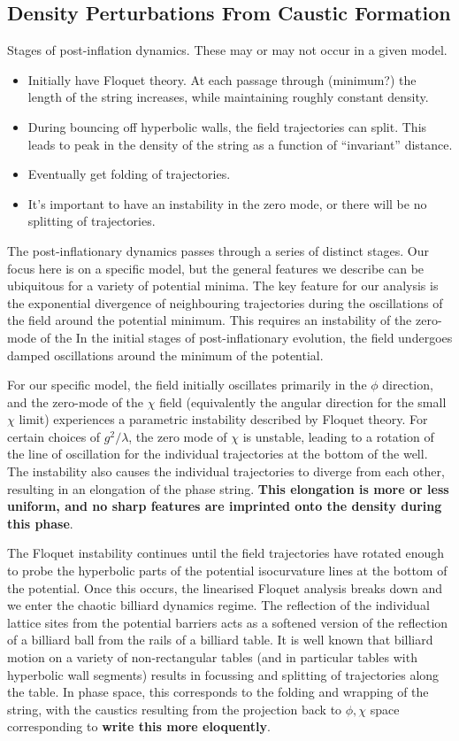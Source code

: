 \documentclass[11pt,a4paper]{article}
\begin{document}
\subsection{Density Perturbations From Caustic Formation}
Stages of post-inflation dynamics.  These may or may not occur in a given model.
\begin{itemize}
\item Initially have Floquet theory.  At each passage through (minimum?) the length of the string increases, while maintaining roughly constant density.
\item During bouncing off hyperbolic walls, the field trajectories can split.  This leads to peak in the density of the string as a function of ``invariant'' distance.
\item Eventually get folding of trajectories.
\item It's important to have an instability in the zero mode, or there will be no splitting of trajectories.
\end{itemize}

The post-inflationary dynamics passes through a series of distinct stages.
Our focus here is on a specific model, but the general features we describe can be ubiquitous for a variety of potential minima.
The key feature for our analysis is the exponential divergence of neighbouring trajectories during the oscillations of the field around the potential minimum.
This requires an instability of the zero-mode of the 
In the initial stages of post-inflationary evolution, the field undergoes damped oscillations around the minimum of the potential.

For our specific model, the field initially oscillates primarily in the $\phi$ direction, and the zero-mode of the $\chi$ field (equivalently the angular direction for the small $\chi$ limit) experiences a parametric instability described by Floquet theory.
For certain choices of $g^2/\lambda$, the zero mode of $\chi$ is unstable, leading to a rotation of the line of oscillation for the individual trajectories at the bottom of the well.
The instability also causes the individual trajectories to diverge from each other, resulting in an elongation of the phase string.
{\bf This elongation is more or less uniform, and no sharp features are imprinted onto the density during this phase}.

The Floquet instability continues until the field trajectories have rotated enough to probe the hyperbolic parts of the potential isocurvature lines at the bottom of the potential.
Once this occurs, the linearised Floquet analysis breaks down and we enter the chaotic billiard dynamics regime.
The reflection of the individual lattice sites from the potential barriers acts as a softened version of the reflection of a billiard ball from the rails of a billiard table.
It is well known that billiard motion on a variety of non-rectangular tables (and in particular tables with hyperbolic wall segments) results in focussing and splitting of trajectories along the table.
In phase space, this corresponds to the folding and wrapping of the string, with the caustics resulting from the projection back to $\phi,\chi$ space corresponding to {\bf write this more eloquently}.
\end{document}
